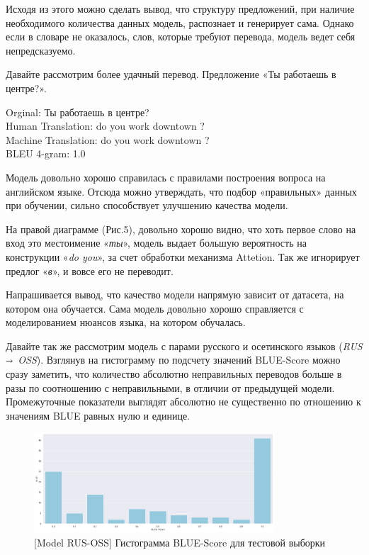 \documentclass[a4paper,12pt]{article}
\begin{document}
	Исходя из этого можно сделать вывод, что структуру предложений, при наличие необходимого количества данных модель, распознает и генерирует сама. Однако если в словаре не оказалось, слов, которые требуют перевода, модель ведет себя непредсказуемо. 
	
	Давайте рассмотрим более удачный перевод. Предложение «Ты работаешь в центре?». 
	
	\begin{table}[h]
	\footnotesize {
    	{Orginal}: Ты работаешь в центре? \\
        {Human Translation}: do you work downtown ? \\
        {Machine Translation}: do you work downtown ? \\
        {BLEU 4-gram}: 1.0
    }
    \end{table}

    Модель довольно хорошо справилась с правилами построения вопроса на английском языке. Отсюда можно утверждать, что подбор «правильных» данных при обучении, сильно способствует улучшению качества модели.
    
    На правой диаграмме (Рис.5), довольно хорошо видно, что хоть первое слово на вход это местоимение «\textit{ты}», модель выдает большую вероятность на конструкции «\textit{do you}», за счет обработки механизма Attetion. Так же игнорирует предлог «\textit{в}», и вовсе его не переводит. 
    
    Напрашивается вывод, что качество модели напрямую зависит от датасета, на котором она обучается. Сама модель довольно хорошо справляется с моделированием нюансов языка, на котором обучалась.
	
	Давайте так же рассмотрим модель с парами русского и осетинского языков (\textit{RUS $\shortrightarrow$ OSS}). Взглянув на гистограмму по подсчету значений BLUE-Score можно сразу заметить, что количество абсолютно неправильных переводов больше в разы по соотношению с неправильными, в отличии от предыдущей модели. Промежуточные показатели выглядят абсолютно не существенно по отношению к значениям BLUE равных нулю и единице.
	
	\begin{figure}[h]
		\centering
		\captionsetup{justification=centering}
		\includegraphics[width=0.8\textwidth]{img/RUS-OSS BLUE Score RUS-ENG Epochs-15.png}
		\caption{ [Model RUS-OSS] Гистограмма BLUE-Score для тестовой выборки}
	\end{figure}
    
\end{document}
